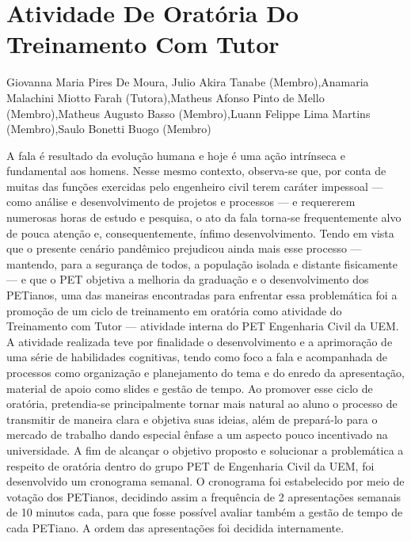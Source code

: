 


\section*{Atividade De Oratória Do Treinamento Com Tutor}

Giovanna Maria Pires De Moura, Julio Akira Tanabe (Membro),Anamaria Malachini Miotto Farah (Tutora),Matheus Afonso Pinto de Mello (Membro),Matheus Augusto Basso (Membro),Luann Felippe Lima Martins (Membro),Saulo Bonetti Buogo (Membro)

A fala é resultado da evolução humana e hoje é uma ação intrínseca e fundamental aos 
homens. Nesse mesmo contexto, observa-se que, por conta de muitas das funções exercidas pelo 
engenheiro civil terem caráter impessoal — como análise e desenvolvimento de projetos e 
processos — e requererem numerosas horas de estudo e pesquisa, o ato da fala torna-se 
frequentemente alvo de pouca atenção e, consequentemente, ínfimo desenvolvimento. Tendo em 
vista que o presente cenário pandêmico prejudicou ainda mais esse processo — mantendo, para a 
segurança de todos, a população isolada e distante fisicamente — e que o PET objetiva a melhoria 
da graduação e o desenvolvimento dos PETianos, uma das maneiras encontradas para enfrentar 
essa problemática foi a promoção de um ciclo de treinamento em oratória como atividade do 
Treinamento com Tutor — atividade interna do PET Engenharia Civil da UEM. 
A atividade realizada teve por finalidade o desenvolvimento e a aprimoração de uma série 
de habilidades cognitivas, tendo como foco a fala e acompanhada de processos como organização 
e planejamento do tema e do enredo da apresentação, material de apoio como slides e gestão de 
tempo. Ao promover esse ciclo de oratória, pretendia-se principalmente tornar mais natural ao 
aluno o processo de transmitir de maneira clara e objetiva suas ideias, além de prepará-lo para o 
mercado de trabalho dando especial ênfase a um aspecto pouco incentivado na universidade.
A fim de alcançar o objetivo proposto e solucionar a problemática a respeito de oratória 
dentro do grupo PET de Engenharia Civil da UEM, foi desenvolvido um cronograma semanal. O 
cronograma foi estabelecido por meio de votação dos PETianos, decidindo assim a frequência de 
2 apresentações semanais de 10 minutos cada, para que fosse possível avaliar também a gestão de 
tempo de cada PETiano. A ordem das apresentações foi decidida internamente.
